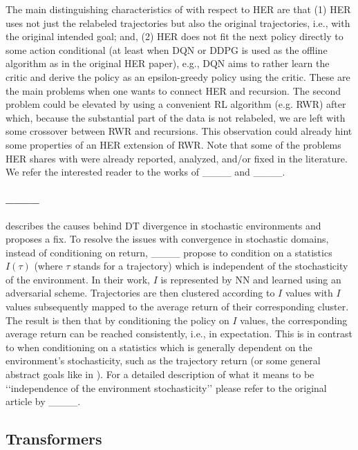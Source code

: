 The main distinguishing characteristics of  \eUDRL{} with respect to HER are that
(1) HER uses not just the relabeled trajectories but also the original trajectories, i.e., with the original intended goal;
and, (2) HER does not fit the next policy directly to some action conditional (at least when DQN or DDPG is used as the offline algorithm as in the original HER paper), e.g., DQN aims to rather learn the critic and derive the policy as an epsilon-greedy
policy using the critic.
These are the main problems when one wants to connect HER and \eUDRL{} recursion.
The second problem could be elevated by using a convenient RL algorithm (e.g. RWR) after which, because the substantial part of the data is not relabeled, we are left with some crossover between RWR and \eUDRL{} recursions.
This observation could already hint some properties of an  HER extension of RWR.
Note that some of the problems HER shares with \eUDRL{} were already reported, analyzed, and/or fixed in the literature. We refer the interested reader to the works of ____ and ____.

\paragraph{____} describes the causes behind DT divergence in stochastic environments and proposes a fix.
To resolve the issues with convergence in stochastic domains, instead of conditioning on return, ____ propose to condition on a statistics
$I(\tau)$ (where $\tau$ stands for a trajectory) which is independent of the stochasticity of the environment. In their work, $I$ is represented by NN and learned using an adversarial scheme. Trajectories are then clustered according to $I$ values with $I$ values subsequently mapped to the average return of their corresponding cluster.
The result is then that by conditioning the policy on $I$ values, the corresponding 
average return can be reached consistently, i.e., in expectation.
This is in contrast to when conditioning on a statistics which is generally dependent on the environment's stochasticity, such as the trajectory return (or some general abstract goals like in \eUDRL{}).
For a detailed description of what it means to be \lq\lq{}independence of the environment stochasticity\rq\rq{}
please refer to the original article by ____.

\subsection{Transformers}
\label{sec:rw:transformers}

